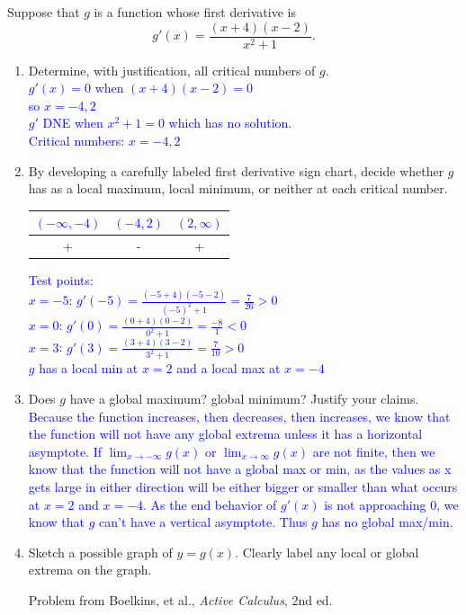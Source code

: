 \documentclass{ximera}
\begin{document}
\begin{exercise}
    Suppose that $g$ is a function whose first derivative is \[g'(x)=\frac{(x+4)(x-2)}{x^2+1}.\]
    \begin{enumerate}
        \item Determine, with justification, all critical numbers of $g$.\\
        \textcolor{blue}{$g'(x)=0$ when $(x+4)(x-2)=0$\\
        so $x=-4, 2$\\
        $g'$ DNE when $x^2+1=0$ which has no solution.\\
        Critical numbers: $x=-4,2$}
        \item  By developing a carefully labeled first derivative sign chart, decide whether $g$ has as a local maximum, local minimum, or neither at each critical number.\\
        \textcolor{blue}{
            \begin{tabular}{c|c|c}
                $(-\infty,-4)$ & $(-4,2)$ & $(2,\infty)$\\
                \hline
                + & - & +\\
            \end{tabular}
        Test points: \\
        $x=-5$: $g'(-5)=\frac{(-5+4)(-5-2)}{(-5)^2+1}=\frac{7}{26}>0$\\
        $x=0$: $g'(0)=\frac{(0+4)(0-2)}{0^2+1}=\frac{-8}{1}<0$\\
        $x=3$: $g'(3)=\frac{(3+4)(3-2)}{3^2+1}=\frac{7}{10}>0$\\
        $g$ has a local min at $x=2$ and a local max at $x=-4$}
        \item Does $g$ have a global maximum? global minimum? Justify your claims.\\
        \textcolor{blue}{Because the function increases, then decreases, then increases, we know that the function will not have any global extrema unless it has a horizontal asymptote. If $\lim_{x\rightarrow -\infty}g(x)$ or $\lim_{x\rightarrow \infty}g(x)$ are not finite, then we know that the function will not have a global max or min, as the values as x gets large in either direction will be either bigger or smaller than what occurs at $x=2$ and $x=-4$. As the end behavior of $g'(x)$ is not approaching 0, we know that $g$ can't have a vertical asymptote.  Thus $g$ has no global max/min. }
        \item Sketch a possible graph of $y=g(x)$. Clearly label any local or global extrema on the graph.\\
        \begin{center}
        \end{center}
    Problem from Boelkins, et al., \textit{Active Calculus}, 2nd ed.
    \end{enumerate}
\end{exercise}
\end{document}
